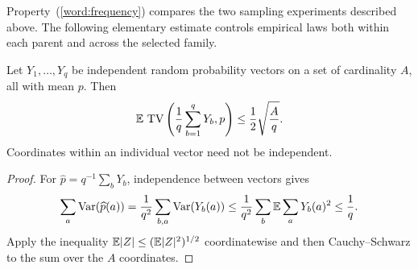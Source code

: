Property~(\ref{word:frequency}) compares the two sampling experiments
described above. The following elementary estimate controls empirical
laws both within each parent and across the selected family.

\begin{lemma}\label{lem:word-tv}
Let $Y_1,\ldots,Y_q$ be independent random probability vectors on a set
of cardinality $A$, all with mean $p$.  Then
\[
  \mathbb E\,\operatorname{TV}\left(\frac1q\sum_{b=1}^qY_b,p\right)
     \le\frac12\sqrt{\frac Aq}.
\]
Coordinates within an individual vector need not be independent.
\end{lemma}
\begin{proof}
For $\widehat p=q^{-1}\sum_bY_b$, independence between vectors gives
\[
 \sum_a\operatorname{Var}(\widehat p(a))
   =\frac1{q^2}\sum_{b,a}\operatorname{Var}(Y_b(a))
   \le\frac1{q^2}\sum_b\mathbb E\sum_aY_b(a)^2
   \le\frac1q.
\]
Apply the inequality $\mathbb E|Z|\le(\mathbb E|Z|^2)^{1/2}$ coordinatewise and then
Cauchy--Schwarz to the sum over the $A$ coordinates.
\end{proof}

